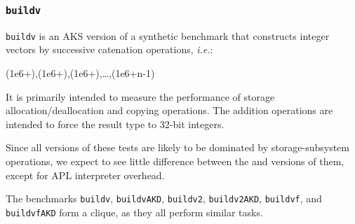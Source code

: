 \subsubsection{\tt buildv}
\label{benchmarkbuildv}

{\tt buildv} is an AKS version of a synthetic benchmark that constructs integer
vectors by successive catenation operations, {\em i.e.}:

 {\apl (1e6+\qiota{}),(1e6+\qiota{}),(1e6+\qiota{}),\dots,(1e6+\qiota\0n-1)}

\noindent It is primarily intended to measure the
performance of storage allocation/deallocation and
copying operations. The addition operations are
intended to force the result type to 32-bit integers.

Since all versions of these tests are likely to be dominated
by storage-subsystem operations, we expect to see little
difference between the \dapl and \sac versions of them,
except for APL interpreter overhead.

The benchmarks {\tt buildv}, {\tt buildvAKD}, {\tt buildv2}, {\tt buildv2AKD},
{\tt buildvf}, and {\tt buildvfAKD} form a clique, as they
all perform similar tasks.
